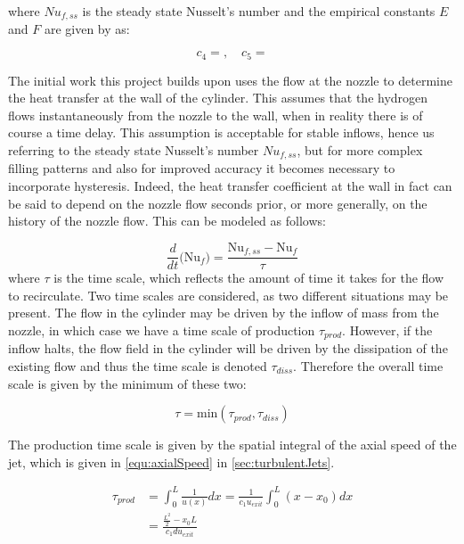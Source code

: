 \noindent where ${Nu}_{f,ss}$ is the steady state Nusselt's number and the empirical constants $E$ and $F$ are given by  as:

\begin{equation}
\label{equ:nusseltReynoldsConsts}
c_4 =   ,  \quad c_5 = 
\end{equation}

The initial work this project builds upon uses the flow at the nozzle to determine the heat transfer at the wall of the cylinder. This assumes that the hydrogen flows instantaneously from the nozzle to the wall, when in reality there is of course a time delay. This assumption is acceptable for stable inflows, hence us referring to the steady state Nusselt's number ${Nu}_{f,ss}$,  but for more complex filling patterns and also for improved accuracy it becomes necessary to incorporate hysteresis. Indeed, the heat transfer coefficient at the wall in fact can be said to depend on the nozzle flow seconds prior, or more generally, on the history of the nozzle flow. This can be modeled as follows: 

\begin{equation}
\frac{d}{dt}\Big(\text{Nu}_f \Big) = \frac{\text{Nu}_{f,ss}-\text{Nu}_f}{\tau}
\end{equation}
where $\tau$ is the time scale, which reflects the amount of time it takes for the flow to recirculate. Two time scales are considered, as two different situations may be present. The flow in the cylinder may be driven by the inflow of mass from the nozzle, in which case we have a time scale of production $\tau_{prod}$. However, if the inflow halts, the flow field in the cylinder will be driven by the dissipation of the existing flow and thus the time scale is denoted $\tau_{diss}$. Therefore the overall time scale is given by the minimum of these two: 

\begin{equation}
\tau = \text{min}\left(\tau_{prod},\tau_{diss}\right)
\end{equation}

\noindent The production time scale is given by the spatial integral of the axial speed of the jet, which is given in \cref{equ:axialSpeed} in \cref{sec:turbulentJets}.

\begin{equation}
\begin{aligned}
\tau_{prod} &= \int_{0}^{L} \frac{1}{u(x)} dx = \frac{1}{c_1 u_{exit}} \int_0^L \left( x - x_0 \right) dx \\[2ex]
 &= \frac{\frac{L^2}{2} - x_0L}{c_1du_{exit}}
\end{aligned}
\end{equation}


